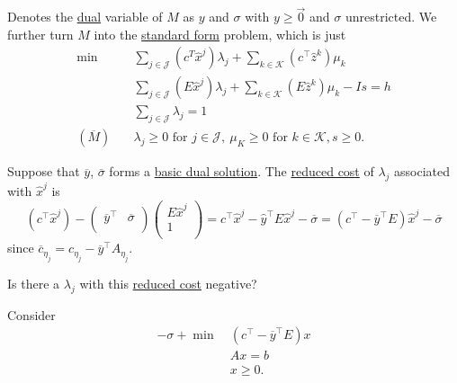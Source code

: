 Denotes the \hyperref[def:dual]{dual} variable of \(M\) as \(y\) and \(\sigma\) with \(y\geq \vec{0}\) and \(\sigma\) unrestricted. We further turn \(M\) into
the \hyperref[def:standard-form]{standard form} problem, which is just
\begin{align*}
	\min~               & \sum\limits_{j\in\mathcal{J}}\left(c^T\hat{x}^j\right)\lambda_{j} + \sum\limits_{k\in\mathcal{K}}\left(c^{\top} \hat{z}^k  \right)\mu_k \\
	                    & \sum\limits_{j\in\mathcal{J}}\left(E\hat{x}^j\right)\lambda_{j} + \sum\limits_{k\in\mathcal{K}}\left(E \hat{z}^k \right)\mu_k - Is = h  \\
	                    & \sum\limits_{j\in\mathcal{J}}\lambda_{j} = 1                                                                                            \\
	(\overline{M})\quad & \lambda_{j}\geq 0 \text{ for }j\in\mathcal{J},\ \mu_K\geq 0 \text{ for }k\in\mathcal{K}, s\geq 0.
\end{align*}

Suppose that \(\overline{y}\), \(\overline{\sigma}\) forms a \hyperref[def:dual-basic-solution]{basic dual solution}. The \hyperref[def:reduced-cost]{reduced cost}
of \(\lambda_{j}\) associated with \(\hat{x}^j\) is
\[
	(c^{\top}\hat{x}^j) - \begin{pmatrix}
		\overline{y}^{\top} & \overline{\sigma} \\
	\end{pmatrix}\begin{pmatrix}
		E\hat{x}^j \\
		1          \\
	\end{pmatrix} = c^{\top}\hat{x}^j - \hat{y}^{\top}E\hat{x}^j - \overline{\sigma} = (c^{\top} - \overline{y}^{\top}E)\hat{x}^j - \overline{\sigma}
\]
since \(\overline{c}_{\eta_{j}} = c_{\eta_{j}} - \overline{y}^{\top}A_{\eta_{j}}\).

\begin{problem}
Is there a \(\lambda_{j}\) with this \hyperref[def:reduced-cost]{reduced cost} negative?
\end{problem}
\begin{answer}
	Consider
	\begin{align*}
		-\sigma + \min~ & (c^{\top} - \overline{y}^{\top}E)x \\
		                & Ax = b                             \\
		                & x\geq 0.
	\end{align*}
\end{answer}

